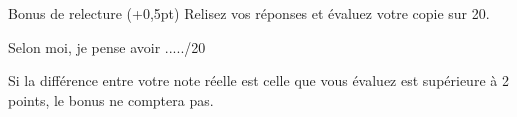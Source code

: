 \begin{facile}{Bonus de relecture (+0,5pt)}
    Relisez vos réponses et évaluez votre copie sur 20. \\
    \begin{center}
        Selon moi, je pense avoir ...../20
    \end{center}
    Si la différence entre votre note réelle est celle que vous évaluez est supérieure à 2 points, le bonus ne comptera pas.
\end{facile}